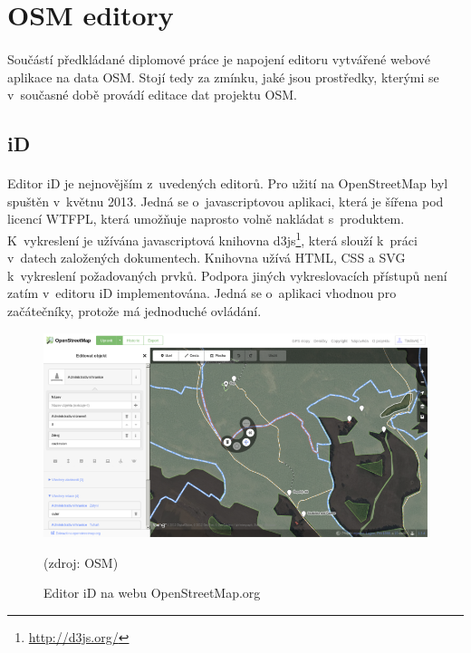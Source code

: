 \documentclass[11pt,a4paper,titlepage,oneside]{book}
\begin{document}
	\section{OSM editory} %
		\label{sec:editory}
		\paragraph{} Součástí předkládané diplomové práce je napojení editoru vytvářené web\-ové aplikace na data \ac{OSM}. Stojí tedy za zmínku, jaké jsou prostředky, kterými se v~současné době provádí editace dat projektu \ac{OSM}. 
		\subsection{iD}




			\paragraph{}Editor iD je nejnovějším z~uvedených editorů. Pro užití na OpenStreetMap byl spuštěn v~květnu 2013. Jedná se o~javascriptovou aplikaci, která je šířena pod licencí \ac{WTFPL}\cite{wiki_wtfpl}, která umožňuje naprosto volně nakládat s~produktem. K~vykreslení je užívána javascriptová knihovna d3js\footnote{\url{http://d3js.org/}}, která slouží k~práci v~datech založených dokumentech. Knihovna užívá \ac{HTML}, \ac{CSS} a \ac{SVG} k~vykreslení požadovaných prvků. Podpora jiných vykreslovacích přístupů není zatím v~editoru iD implementována. Jedná se o~aplikaci vhodnou pro začátečníky, protože má jednoduché ovládání.

		\begin{figure}[!h]
			\begin{center}
				\includegraphics[width=12cm]{obrazky/iD_osm.png}
				\caption{Editor iD na webu OpenStreetMap.org} (zdroj: \ac{OSM}\cite{osm_edit})
				\label{fig:iD_osm}
			\end{center}
		\end{figure}
\end{document}
